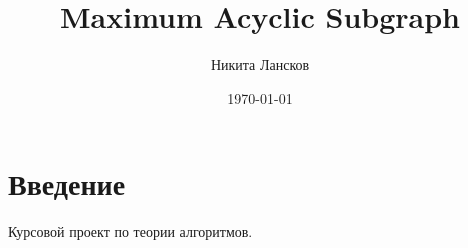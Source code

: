 \documentclass[a4paper,12pt]{article}
\author{Никита Лансков}
\title{Maximum Acyclic Subgraph}
\date{\today}
\begin{document}

\maketitle
\tableofcontents

\section*{Введение}

Курсовой проект по теории алгоритмов.






% 






\end{document}
